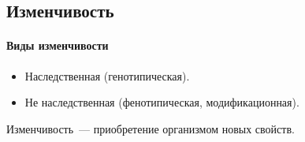 \documentclass[12pt]{article}
\begin{document}
	\subsection{Изменчивость}
	
	\paragraph{Виды изменчивости}
	
	\begin{itemize}
		\item Наследственная (генотипическая).
		\item Не наследственная (фенотипическая, модификационная).
	\end{itemize}
	
	\begin{definition}
		Изменчивость~--- приобретение организмом новых свойств.
	\end{definition}
	
\end{document}
